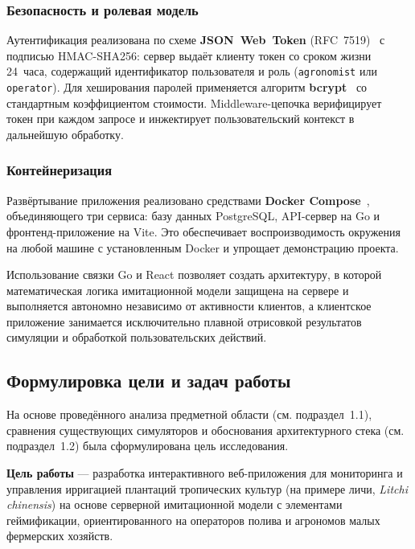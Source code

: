 \subsubsection{Безопасность и ролевая модель}

Аутентификация реализована по схеме \textbf{JSON~Web~Token}
(RFC~7519)~\cite{rfc7519_ietf,jwt_io_intro} с подписью HMAC-SHA256:
сервер выдаёт клиенту токен со сроком жизни 24~часа, содержащий
идентификатор пользователя и роль (\texttt{agronomist} или
\texttt{operator}). Для хеширования паролей применяется алгоритм
\textbf{bcrypt}~\cite{provos_mazieres_1999,pkggo_bcrypt} со стандартным
коэффициентом стоимости. Middleware-цепочка верифицирует токен при
каждом запросе и инжектирует пользовательский контекст в дальнейшую
обработку.

\subsubsection{Контейнеризация}

Развёртывание приложения реализовано средствами \textbf{Docker
Compose}~\cite{docker_compose_docs,docker_compose_file_reference},
объединяющего три сервиса: базу данных PostgreSQL, API-сервер на Go и
фронтенд-приложение на Vite. Это обеспечивает воспроизводимость
окружения на любой машине с установленным Docker и упрощает
демонстрацию проекта.

Использование связки Go и React позволяет создать архитектуру, в
которой математическая логика имитационной модели защищена на сервере
и выполняется автономно независимо от активности клиентов, а
клиентское приложение занимается исключительно плавной отрисовкой
результатов симуляции и обработкой пользовательских действий.

\subsection{Формулировка цели и задач работы}

На основе проведённого анализа предметной области (см.
подраздел~1.1), сравнения существующих симуляторов и обоснования
архитектурного стека (см. подраздел~1.2) была сформулирована цель
исследования.

\textbf{Цель работы} --- разработка интерактивного веб-приложения для
мониторинга и управления ирригацией плантаций тропических культур
(на примере личи, \emph{Litchi chinensis}) на основе серверной
имитационной модели с элементами геймификации, ориентированного
на операторов полива и агрономов малых фермерских хозяйств.

